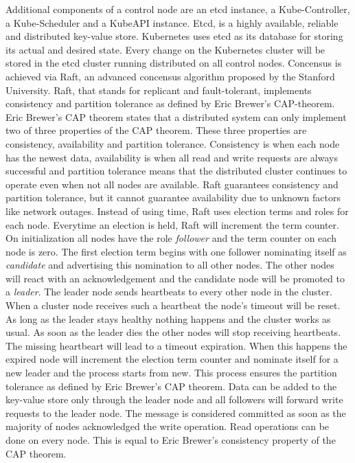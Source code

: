 \documentclass[titlepage]{report}
\begin{document}
Additional components of a control node are an etcd\cite{etcd} instance, a Kube-Controller, a Kube-Scheduler and a KubeAPI instance. Etcd, is a highly available, reliable and distributed key-value store. Kubernetes uses etcd as its database for storing its actual 
and desired state. Every change on the Kubernetes cluster will be stored in the etcd cluster running distributed on all control nodes. Concensus is achieved via Raft, an advanced concensus algorithm proposed
by the Stanford University\cite{ongaro2013search}\cite{ongaro2014search}. Raft, that stands for replicant and fault-tolerant, implements consistency and partition tolerance as defined by Eric Brewer's CAP-theorem\cite{brewer2017spanner}.
Eric Brewer's CAP theorem states that a distributed system can only implement two of three properties of the CAP theorem. These three properties are consistency, availability and partition tolerance. Consistency is when each node
has the newest data, availability is when all read and write requests are always successful and partition tolerance means that the distributed cluster continues to operate even when not all nodes are available\cite{bijlsma2020distributed}.
Raft guarantees consistency and partition tolerance, but it cannot guarantee availability due to unknown factors like network outages.  Instead of using time, Raft uses election terms and roles for each node. Everytime an election is held,
Raft will increment the term counter. On initialization all nodes have the role \emph{follower} and the term counter on each node is zero. The first election term begins with one follower nominating itself as \emph{candidate} and
advertising this nomination to all other nodes. The other nodes will react with an acknowledgement and the candidate node will be promoted to a \emph{leader}. The leader node sends heartbeats to every other node in the cluster.
When a cluster node receives such a heartbeat the node's timeout will be reset. As long as the leader stays healthy nothing happens and the cluster works as usual. As soon as the leader dies the other nodes will stop
receiving heartbeats. The missing heartbeart will lead to a timeout expiration. When this happens the expired node will increment the election term counter and nominate itself for a new leader and the process starts from new.
This process ensures the partition tolerance as defined by Eric Brewer's CAP theorem. Data can be added to the key-value store only through the leader node and all followers will forward write requests to the leader node. 
The message is considered committed as soon as the majority of nodes acknowledged the write operation. Read operations can be done on every node. This is equal to Eric Brewer's consistency property of the CAP theorem.
\end{document}
